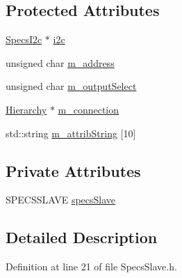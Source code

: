 \subsection*{Protected Attributes}
\begin{DoxyCompactItemize}
\item 
\hyperlink{classSpecsI2c}{SpecsI2c} $\ast$ \hyperlink{classSpecsSlave_a5210e5a45c381ee29a830b42119ec1d3}{i2c}
\item 
unsigned char \hyperlink{classSpecsInterface_a4064da5ca6e0a172363967c4acc0b365}{m\_\-address}
\item 
unsigned char \hyperlink{classSpecsInterface_a660cb4112ce1c071f277cb6ec115b411}{m\_\-outputSelect}
\item 
\hyperlink{classHierarchy}{Hierarchy} $\ast$ \hyperlink{classElement_abe3de7a5dbbc9a6dd2d7e012e5fdb266}{m\_\-connection}
\item 
std::string \hyperlink{classAttrib_a3414521d7a82476e874b25a5407b5e63}{m\_\-attribString} \mbox{[}10\mbox{]}
\end{DoxyCompactItemize}
\subsection*{Private Attributes}
\begin{DoxyCompactItemize}
\item 
SPECSSLAVE \hyperlink{classSpecsSlave_a98f0190d671023c3d874088ea2bd874b}{specsSlave}
\end{DoxyCompactItemize}


\subsection{Detailed Description}


Definition at line 21 of file SpecsSlave.h.

